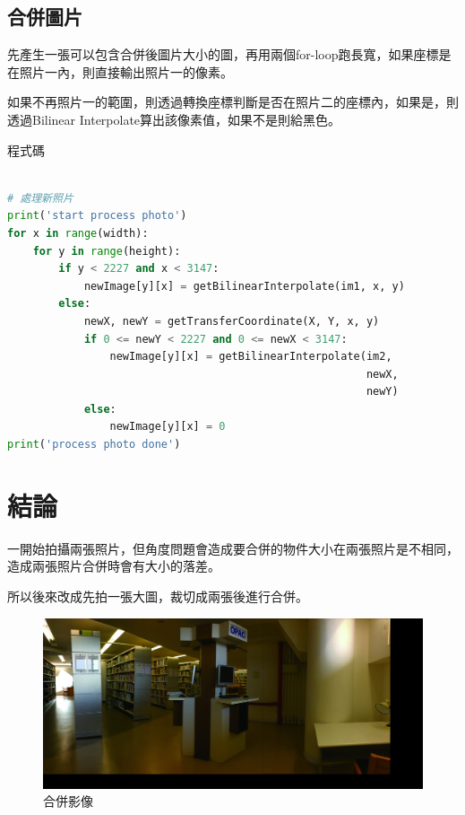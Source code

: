 \documentclass[12pt,a4paper]{article}
\begin{document}
\subsection{合併圖片}

{
先產生一張可以包含合併後圖片大小的圖，再用兩個for-loop跑長寬，如果座標是在照片一內，則直接輸出照片一的像素。

如果不再照片一的範圍，則透過轉換座標判斷是否在照片二的座標內，如果是，則透過Bilinear Interpolate算出該像素值，如果不是則給黑色。

程式碼
\begin{lstlisting}[language=Python]

# 處理新照片
print('start process photo')
for x in range(width):
    for y in range(height):
        if y < 2227 and x < 3147:
            newImage[y][x] = getBilinearInterpolate(im1, x, y)
        else:
            newX, newY = getTransferCoordinate(X, Y, x, y)
            if 0 <= newY < 2227 and 0 <= newX < 3147:
                newImage[y][x] = getBilinearInterpolate(im2, 
                										newX,
                										newY)
            else:
                newImage[y][x] = 0
print('process photo done')
\end{lstlisting}
}

\section{結論}

一開始拍攝兩張照片，但角度問題會造成要合併的物件大小在兩張照片是不相同，造成兩張照片合併時會有大小的落差。

所以後來改成先拍一張大圖，裁切成兩張後進行合併。
\begin{figure}[ht]
\centering
\includegraphics[width=1\textwidth]{image/combineBilinearPhoto.jpg}
\caption{合併影像}%
\label{合併影像}%
\end{figure}
\end{document}

